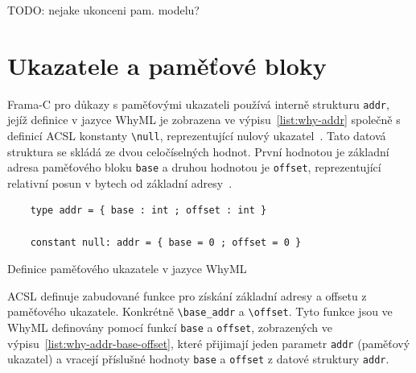 TODO: nejake ukonceni pam. modelu?



\section{Ukazatele a paměťové bloky}
\label{sec:ukazatele-a-pametove-bloky}

Frama\mbox{-}C pro důkazy s paměťovými ukazateli používá interně strukturu \texttt{addr},
jejíž definice v jazyce WhyML je zobrazena ve výpisu~\ref{list:why-addr}
společně s definicí ACSL konstanty \texttt{\textbackslash null},
reprezentující nulový ukazatel~\cite{FCGitWhy}.
Tato datová struktura se skládá ze dvou celočíselných hodnot.
První hodnotou je základní adresa paměťového bloku \texttt{base}
a druhou hodnotou je \texttt{offset}, reprezentující relativní posun v bytech od základní adresy~\cite{BlanchardWP2024}.


\begin{listing}[H]
    \begin{verbatim}
    type addr = { base : int ; offset : int }

    constant null: addr = { base = 0 ; offset = 0 }
    \end{verbatim}
    \caption{Definice paměťového ukazatele v jazyce WhyML}
    \label{list:why-addr}
\end{listing}

ACSL definuje zabudované funkce pro získání základní adresy a offsetu z paměťového ukazatele.
Konkrétně \texttt{\textbackslash base\_addr} a \texttt{\textbackslash offset}.
Tyto funkce jsou ve WhyML definovány pomocí funkcí \texttt{base} a \texttt{offset},
zobrazených ve výpisu~\ref{list:why-addr-base-offset},
které přijimají jeden parametr \texttt{addr} (paměťový ukazatel)
a vracejí příslušné hodnoty \texttt{base} a \texttt{offset} z datové struktury \texttt{addr}.

